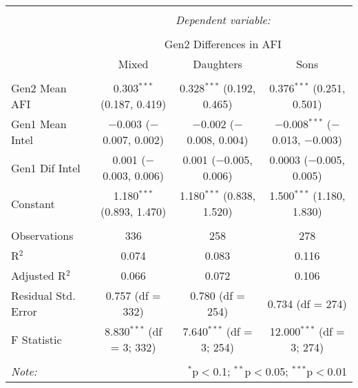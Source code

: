 
\begingroup 
\small 
\begin{tabular}{@{\extracolsep{1pt}}lccc} 
\\[-1.8ex]\hline 
\hline \\[-1.8ex] 
 & \multicolumn{3}{c}{\textit{Dependent variable:}} \\ 
\cline{2-4} 
\\[-1.8ex] & \multicolumn{3}{c}{Gen2 Differences in AFI} \\ 
 & Mixed & Daughters & Sons \\ 
\hline \\[-1.8ex] 
 Gen2 Mean AFI & 0.303$^{***}$ (0.187, 0.419) & 0.328$^{***}$ (0.192, 0.465) & 0.376$^{***}$ (0.251, 0.501) \\ 
  Gen1 Mean Intel & $-$0.003 ($-$0.007, 0.002) & $-$0.002 ($-$0.008, 0.004) & $-$0.008$^{***}$ ($-$0.013, $-$0.003) \\ 
  Gen1 Dif Intel & 0.001 ($-$0.003, 0.006) & 0.001 ($-$0.005, 0.006) & 0.0003 ($-$0.005, 0.005) \\ 
  Constant & 1.180$^{***}$ (0.893, 1.470) & 1.180$^{***}$ (0.838, 1.520) & 1.500$^{***}$ (1.180, 1.830) \\ 
 \hline \\[-1.8ex] 
Observations & 336 & 258 & 278 \\ 
R$^{2}$ & 0.074 & 0.083 & 0.116 \\ 
Adjusted R$^{2}$ & 0.066 & 0.072 & 0.106 \\ 
Residual Std. Error & 0.757 (df = 332) & 0.780 (df = 254) & 0.734 (df = 274) \\ 
F Statistic & 8.830$^{***}$ (df = 3; 332) & 7.640$^{***}$ (df = 3; 254) & 12.000$^{***}$ (df = 3; 274) \\ 
\hline 
\hline \\[-1.8ex] 
\textit{Note:}  & \multicolumn{3}{r}{$^{*}$p$<$0.1; $^{**}$p$<$0.05; $^{***}$p$<$0.01} \\ 
\end{tabular} 
\endgroup 
